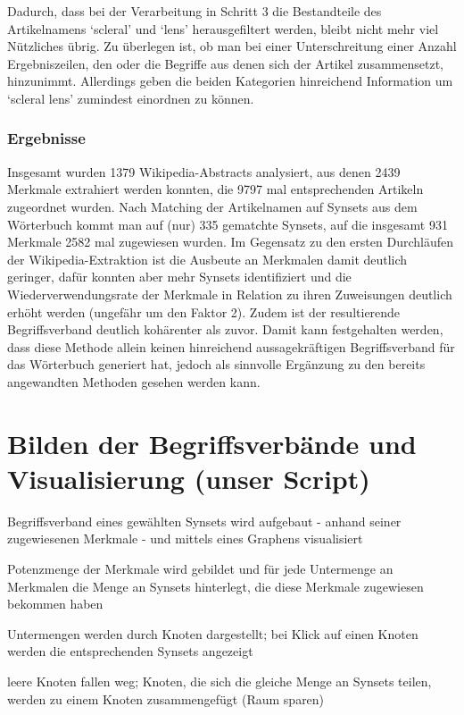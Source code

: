 \documentclass[pagesize,DIV=calc,12pt,draft]{scrreprt}
\begin{document}
Dadurch, dass bei der Verarbeitung in Schritt 3 die Bestandteile des Artikelnamens `scleral' und `lens' herausgefiltert werden, bleibt nicht mehr viel Nützliches übrig. 
Zu überlegen ist, ob man bei einer Unterschreitung einer Anzahl Ergebniszeilen, den oder die Begriffe aus denen sich der Artikel zusammensetzt, hinzunimmt. 
Allerdings geben die beiden Kategorien hinreichend Information um `scleral lens' zumindest einordnen zu können. 

\subsubsection{Ergebnisse}

Insgesamt wurden 1379 Wikipedia-Abstracts analysiert, aus denen 2439 Merkmale extrahiert werden konnten, die 9797 mal entsprechenden Artikeln zugeordnet wurden. 
Nach Matching der Artikelnamen auf Synsets aus dem Wörterbuch kommt man auf (nur) 335 gematchte Synsets, auf die insgesamt 931 Merkmale 2582 mal zugewiesen wurden. 
Im Gegensatz zu den ersten Durchläufen der Wikipedia-Extraktion ist die Ausbeute an Merkmalen damit deutlich geringer, dafür konnten aber mehr Synsets identifiziert und die Wiederverwendungsrate der Merkmale in Relation zu ihren Zuweisungen deutlich erhöht werden (ungefähr um den Faktor 2). 
Zudem ist der resultierende Begriffsverband deutlich kohärenter als zuvor. 
Damit kann festgehalten werden, dass diese Methode allein keinen hinreichend aussagekräftigen Begriffsverband für das Wörterbuch generiert hat, jedoch als sinnvolle Ergänzung zu den bereits angewandten Methoden gesehen werden kann. 

\section{Bilden der Begriffsverbände und Visualisierung (unser Script)}

\begin{inparaenum}
\item Begriffsverband eines gewählten Synsets wird aufgebaut - anhand seiner zugewiesenen Merkmale - und mittels eines Graphens visualisiert

\item Potenzmenge der Merkmale wird gebildet und für jede Untermenge an Merkmalen die Menge an Synsets hinterlegt, die diese Merkmale zugewiesen bekommen haben

\item Untermengen werden durch Knoten dargestellt; bei Klick auf einen Knoten werden die entsprechenden Synsets angezeigt

\item leere Knoten fallen weg; Knoten, die sich die gleiche Menge an Synsets teilen, werden zu einem Knoten zusammengefügt (Raum sparen)
\end{inparaenum}
\end{document}
